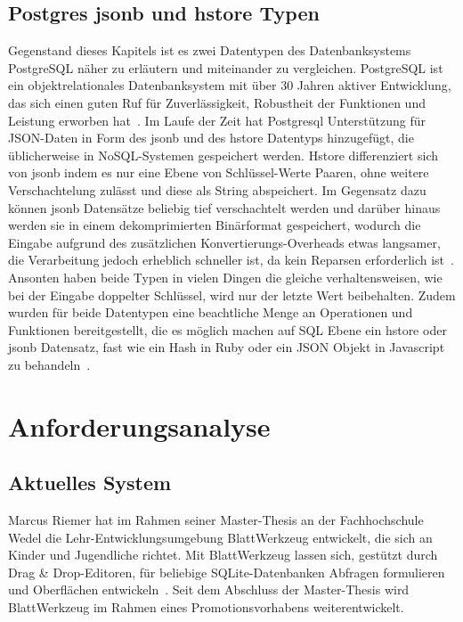 \section{Postgres jsonb und hstore Typen}
Gegenstand dieses Kapitels ist es zwei Datentypen des Datenbanksystems PostgreSQL näher zu erläutern und miteinander zu vergleichen.
PostgreSQL ist ein objektrelationales Datenbanksystem mit über 30 Jahren aktiver Entwicklung,
das sich einen guten Ruf für Zuverlässigkeit, Robustheit der Funktionen und Leistung erworben hat~\cite{postgresql}.
Im Laufe der Zeit hat Postgresql Unterstützung für JSON-Daten in Form des jsonb und des hstore Datentyps hinzugefügt,
die üblicherweise in NoSQL-Systemen gespeichert werden.
Hstore differenziert sich von jsonb indem es nur eine Ebene von Schlüssel-Werte Paaren, ohne weitere Verschachtelung zulässt und
diese als String abspeichert.
Im Gegensatz dazu können jsonb Datensätze beliebig tief verschachtelt werden und
darüber hinaus werden sie in einem dekomprimierten Binärformat gespeichert, wodurch die Eingabe aufgrund des zusätzlichen Konvertierungs-Overheads etwas langsamer,
die Verarbeitung jedoch erheblich schneller ist, da kein Reparsen erforderlich ist~\cite{postgresql-json}.
Ansonten haben beide Typen in vielen Dingen die gleiche verhaltensweisen, wie bei der Eingabe doppelter Schlüssel, wird nur der letzte Wert beibehalten.
Zudem wurden für beide Datentypen eine beachtliche Menge an Operationen und Funktionen bereitgestellt, die es möglich machen auf SQL Ebene ein hstore oder jsonb Datensatz,
fast wie ein Hash in Ruby oder ein JSON Objekt in Javascript zu behandeln~\cite{postgresql-hstore}.


\chapter{Anforderungsanalyse}
\section{Aktuelles System}

Marcus Riemer hat im Rahmen seiner Master-Thesis an der Fachhochschule Wedel die Lehr-Entwicklungsumgebung BlattWerkzeug entwickelt,
die sich an Kinder und Jugendliche richtet. Mit BlattWerkzeug lassen sich, gestützt durch Drag \& Drop-Edi\-toren,
für beliebige SQLite-Datenbanken Abfragen formulieren und Oberflächen entwickeln~\cite[2]{riemer2016}.
Seit dem Abschluss der Master-Thesis wird BlattWerkzeug im Rahmen eines Promotionsvorhabens weiterentwickelt.

